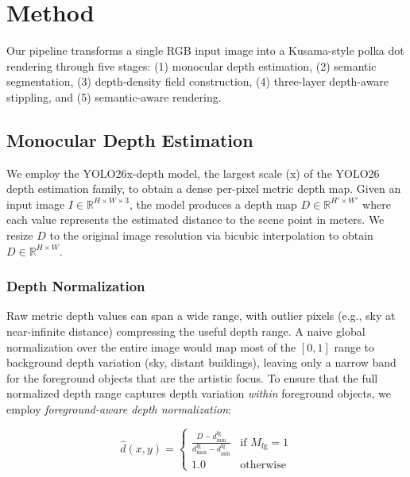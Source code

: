 \section{Method}
\label{sec:method}

Our pipeline transforms a single RGB input image into a Kusama-style
polka dot rendering through five stages: (1) monocular depth
estimation, (2) semantic segmentation, (3) depth-density field
construction, (4) three-layer depth-aware stippling, and (5)
semantic-aware rendering.

\subsection{Monocular Depth Estimation}
\label{sec:method:depth}

We employ the YOLO26x-depth model, the largest scale (x) of the YOLO26
depth estimation family, to obtain a dense per-pixel metric depth map.
Given an input image $I \in \mathbb{R}^{H \times W \times 3}$, the
model produces a depth map $D \in \mathbb{R}^{H' \times W'}$ where each
value represents the estimated distance to the scene point in meters.
We resize $D$ to the original image resolution via bicubic interpolation
to obtain $D \in \mathbb{R}^{H \times W}$.

\subsubsection{Depth Normalization}

Raw metric depth values can span a wide range, with outlier pixels
(e.g., sky at near-infinite distance) compressing the useful depth
range. A naive global normalization over the entire image would map
most of the $[0, 1]$ range to background depth variation (sky, distant
buildings), leaving only a narrow band for the foreground objects that
are the artistic focus. To ensure that the full normalized depth range
captures depth variation \emph{within} foreground objects, we employ
\emph{foreground-aware depth normalization}:

\begin{equation}
    \hat{d}(x,y) = \begin{cases}
        \displaystyle\frac{D - d_{\min}^{\text{fg}}}{d_{\max}^{\text{fg}} - d_{\min}^{\text{fg}}} & \text{if } M_{\text{fg}} = 1 \\[6pt]
        1.0 & \text{otherwise}
    \end{cases}
    \label{eq:depth_norm}
\end{equation}

